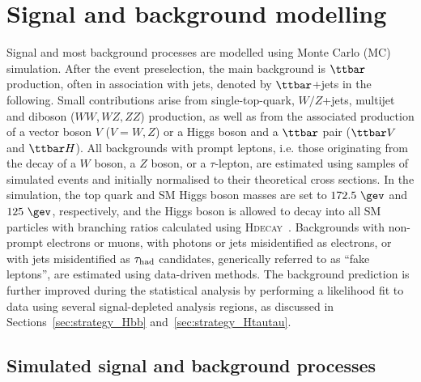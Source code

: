\section{Signal and background modelling}
\label{sec:signal_background_model}

Signal and most background processes are modelled using Monte Carlo (MC) simulation.
After the event preselection, the main background is $\ttbar$ production, often in association with jets, denoted by $\ttbar$+jets in the following.
Small contributions arise from single-top-quark, $W/Z$+jets, multijet and diboson ($WW,WZ,ZZ$) production, as well as from the associated 
production of a vector boson $V$ ($V=W,Z$) or a Higgs boson and a $\ttbar$ pair ($\ttbar V$ and $\ttbar H$). All backgrounds 
with prompt leptons, i.e. those originating from the decay of a $W$ boson, a $Z$ boson, or a $\tau$-lepton,
are estimated using samples of simulated events and initially normalised to their theoretical cross sections.
In the simulation, the top quark and SM Higgs boson masses are set to $172.5~\gev$ and $125~\gev$, respectively,
and the Higgs boson is allowed to decay into all SM particles with branching ratios calculated using \textsc{Hdecay}~\cite{Djouadi:1997yw}.  
Backgrounds with non-prompt electrons or muons, with photons or jets misidentified as electrons, or with jets misidentified as $\tau_{\mathrm{had}}$ candidates, 
generically referred to as ``fake leptons'', are estimated using data-driven methods. 
The background prediction is further improved during the statistical analysis by performing a likelihood 
fit to data using several signal-depleted analysis regions, as discussed in Sections~\ref{sec:strategy_Hbb} and~\ref{sec:strategy_Htautau}.

\subsection{Simulated signal and background processes}
\label{sec:simulations}

